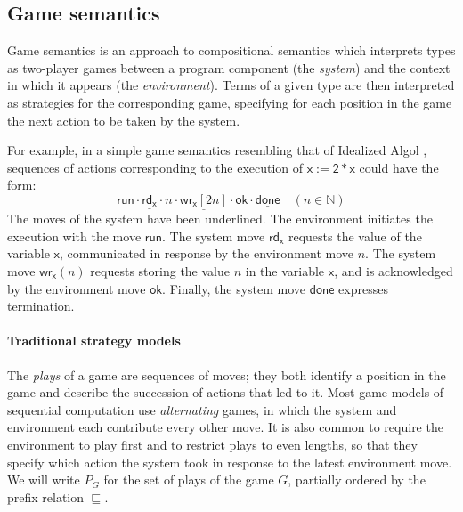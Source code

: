 \documentclass[sigplan,screen]{acmart}
\newcommand{\kw}[1]{\ensuremath{ \mathsf{#1} }}
\begin{document}


\subsection{Game semantics} \label{sec:strat} %


Game semantics is an approach to compositional semantics
which interprets types as two-player games
between a program component (the \emph{system})
and the context in which it appears (the \emph{environment}).
Terms of a given type are then interpreted as
strategies for the corresponding game,
specifying for each position in the game
the next action to be taken by the system.

For example,
in a simple game semantics resembling that of
Idealized Algol \cite{gsia},
sequences of actions corresponding to
the execution of $\kw{x := 2 * x}$
could have the form:
\[
    \kw{run} \cdot
    \underline{\kw{rd}_\kw{x}} \cdot n \cdot
    \underline{\kw{wr}_\kw{x}[2n]} \cdot \kw{ok} \cdot
    \underline{\kw{done}} \quad (n \in \mathbb{N})
\]
The moves of the system have been underlined.
The environment initiates the execution with
the move $\kw{run}$.
The system move $\kw{rd}_\kw{x}$ requests
the value of the variable $\kw{x}$,
communicated in response by the environment move $n$.
The system move $\kw{wr}_\kw{x}(n)$ requests
storing the value $n$ in the variable $\kw{x}$,
and is acknowledged by the environment move $\kw{ok}$.
Finally, the system move $\kw{done}$
expresses termination.


\paragraph{Traditional strategy models} %

The \emph{plays} of a game are sequences of moves;
they both identify a position in the game
and describe the succession of actions that led to it.
Most game models of sequential computation
use \emph{alternating} games,
in which
the system and environment each contribute
every other move.
It is also common to require the environment to play first
and to restrict plays to even lengths,
so that they specify which action the system took
in response to the latest environment move.
We will write $P_G$ for the set of plays of the game $G$,
partially ordered by the prefix relation $\sqsubseteq$.
\end{document}
